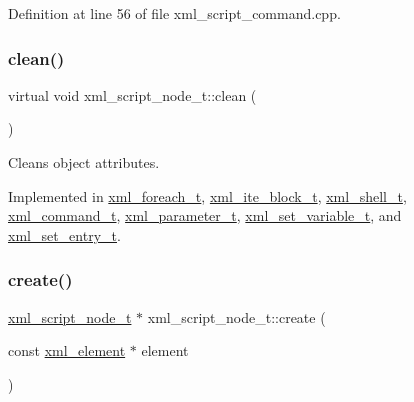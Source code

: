 Definition at line 56 of file xml\+\_\+script\+\_\+command.\+cpp.

\mbox{\label{classxml__script__node__t_a2be778f2caef531c55b36c2bf2c996e2}} 
\subsubsection{\texorpdfstring{clean()}{clean()}}
{\footnotesize\ttfamily virtual void xml\+\_\+script\+\_\+node\+\_\+t\+::clean (\begin{DoxyParamCaption}{ }\end{DoxyParamCaption})\hspace{0.3cm}{\ttfamily [pure virtual]}}



Cleans object attributes. 



Implemented in \hyperlink{structxml__foreach__t_a62c4df007dbccbb16e471905c3a64826}{xml\+\_\+foreach\+\_\+t}, \hyperlink{classxml__ite__block__t_ab5a5590475fc25a5601daefd8a0deac3}{xml\+\_\+ite\+\_\+block\+\_\+t}, \hyperlink{classxml__shell__t_a372d74254457c1e1a7f2ffa093d25397}{xml\+\_\+shell\+\_\+t}, \hyperlink{classxml__command__t_ace4f9e713601beb9a850d2459550789f}{xml\+\_\+command\+\_\+t}, \hyperlink{classxml__parameter__t_a9fc1880ab4a4e6e4caa97f9f858c4c2e}{xml\+\_\+parameter\+\_\+t}, \hyperlink{classxml__set__variable__t_ac31d6bc914adb2a642e69adfabdb5f71}{xml\+\_\+set\+\_\+variable\+\_\+t}, and \hyperlink{classxml__set__entry__t_ac996d3a7900d2deceeee5efcea48bb3a}{xml\+\_\+set\+\_\+entry\+\_\+t}.

\mbox{\label{classxml__script__node__t_aed7d38abc27f6750b763da3ccd7b4b87}} 
\subsubsection{\texorpdfstring{create()}{create()}}
{\footnotesize\ttfamily \hyperlink{classxml__script__node__t}{xml\+\_\+script\+\_\+node\+\_\+t} $\ast$ xml\+\_\+script\+\_\+node\+\_\+t\+::create (\begin{DoxyParamCaption}\item[{const \hyperlink{classxml__element}{xml\+\_\+element} $\ast$}]{element }\end{DoxyParamCaption})\hspace{0.3cm}{\ttfamily [static]}}



